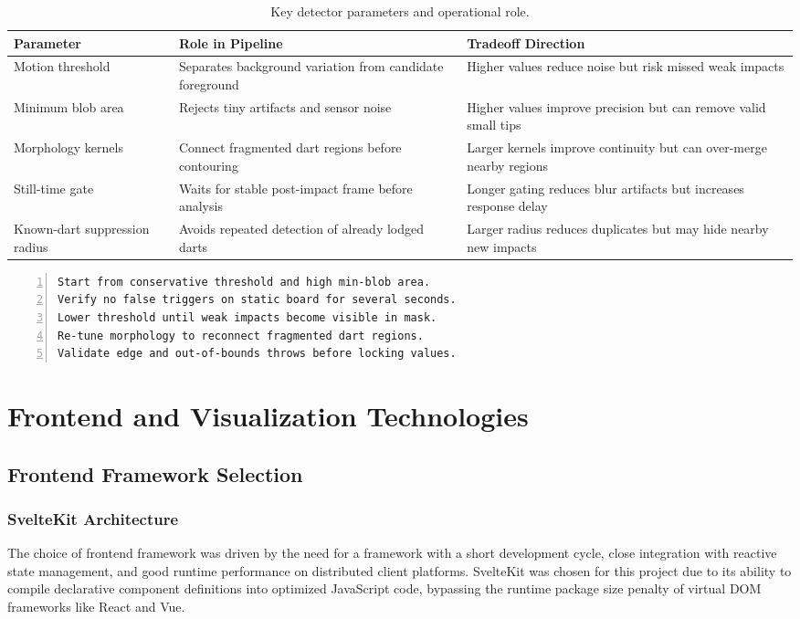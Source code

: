 \begin{table}[H]
	\centering
	\begin{tabularx}{\linewidth}{@{}X X X@{}}
		\toprule
		\textbf{Parameter} & \textbf{Role in Pipeline} & \textbf{Tradeoff Direction} \\
		\midrule
		Motion threshold & Separates background variation from candidate foreground & Higher values reduce noise but risk missed weak impacts \\
		Minimum blob area & Rejects tiny artifacts and sensor noise & Higher values improve precision but can remove valid small tips \\
		Morphology kernels & Connect fragmented dart regions before contouring & Larger kernels improve continuity but can over-merge nearby regions \\
		Still-time gate & Waits for stable post-impact frame before analysis & Longer gating reduces blur artifacts but increases response delay \\
		Known-dart suppression radius & Avoids repeated detection of already lodged darts & Larger radius reduces duplicates but may hide nearby new impacts \\
		\bottomrule
	\end{tabularx}
\caption{Key detector parameters and operational role.}
\label{tab:detector_parameters}
\end{table}

\vspace{\baselineskip}

\begin{lstlisting}[numbers=left,caption=Parameter tuning strategy used during detector stabilization, label=lst:parameter_tuning_strategy]
Start from conservative threshold and high min-blob area.
Verify no false triggers on static board for several seconds.
Lower threshold until weak impacts become visible in mask.
Re-tune morphology to reconnect fragmented dart regions.
Validate edge and out-of-bounds throws before locking values.
\end{lstlisting}

\setauthor{\firstauthor}
\section{Frontend and Visualization Technologies}
\subsection{Frontend Framework Selection}
\subsubsection{SvelteKit Architecture}
The choice of frontend framework was driven by the need for a framework with a short development cycle, close integration with reactive state management, and good runtime performance on distributed client platforms. SvelteKit was chosen for this project due to its ability to compile declarative component definitions into optimized JavaScript code, bypassing the runtime package size penalty of virtual DOM frameworks like React and Vue.

